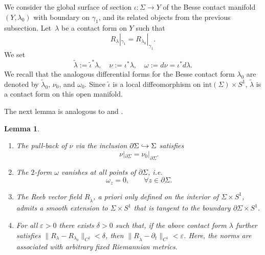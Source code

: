 \documentclass[10pt,a4paper]{amsart}
\providecommand{\ie}{i.e.\ }
\providecommand{\skpt}{\smallskip}
\let\epsilon\varepsilon
\newenvironment{enumeratei}
{\bgroup\def\theenumi{\roman{enumi}}\def\theenumii{\arabic{enumii}}\begin{enumerate}}
{\end{enumerate}\egroup}
\newcommand\hto{\mathrel{\lhook\joinrel\to}}
\newtheorem{lem}[thm]{Lemma}
\theoremstyle{definition}
\providecommand{\ie}{i.e. }
\providecommand{\skpt}{\par\smallskip}
\begin{document}
We consider the global surface of section $\iota:\Sigma\to Y$ of the Besse contact manifold $(Y,\lambda_0)$ with boundary on $\gamma_1$, and its related objects from the previous subsection.
Let~$\lambda$ be a contact form on $Y$ such that
\begin{equation}
\label{e:same_Reeb_on_gamma_1}
R_{\lambda}|_{\gamma_1}=R_{\lambda_0}|_{\gamma_1}.
\end{equation}
We set
\[
\tilde{\lambda} := \tilde\iota^* \lambda, \quad \nu := \iota^* \lambda, \quad \omega := d\nu = \iota^* d\lambda.
\]
We recall that the analogous differential forms for the Besse contact form $\lambda_0$ are denoted by $\tilde\lambda_0$, $\nu_0$, and $\omega_0$. Since $\tilde\iota$ is a local diffeomorphism on $\mathrm{int}(\Sigma) \times S^1$, $\tilde{\lambda}$ is a contact form on this open manifold.

The next lemma is analogous to \cite[Prop.\,3.6]{Abbondandolo:2018fb} and \cite[Prop.\,3.10]{Benedetti:2021aa}.

\skpt
\begin{lem}\label{l:nearly_Besse_normalized}
\begin{enumeratei}

\item\label{l:nearly_Besse_normalizedi}
The pull-back of $\nu$ via the inclusion $\partial\Sigma\hto\Sigma$ satisfies
\[
\nu|_{\partial\Sigma}=\nu_0|_{\partial\Sigma}.
\]

\item\label{l:nearly_Besse_normalizedii}
The $2$-form $\omega$ vanishes at all points of $\partial\Sigma$, \ie
\[
\omega_z= 0,\qquad \forall z\in \partial\Sigma.
\]

\item\label{l:nearly_Besse_normalizediii}
The Reeb vector field $R_{\tilde\lambda}$, a priori only defined on the interior of $\Sigma\times S^1$, admits a smooth extension to $\Sigma\times S^1$ that is tangent to the boundary $\partial \Sigma\times S^1$.

\item\label{l:nearly_Besse_normalizediv}
For all $\epsilon>0$ there exists $\delta>0$ such that, if the above contact form $\lambda$ further satisfies $\|R_\lambda-R_{\lambda_0}\|_{C^2}<\delta$, then $\|R_{\tilde\lambda}-\partial_t\|_{C^1}<\epsilon$. Here, the norms are associated with arbitrary fixed Riemannian metrics.
\end{enumeratei}
\end{lem}
\end{document}
